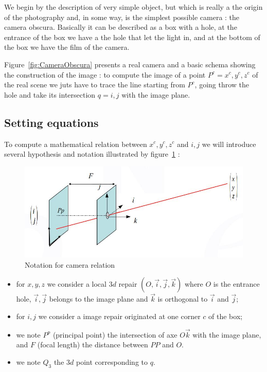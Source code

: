 We begin by the description of very simple object, but which is really a the origin of
the photography and, in some way, is the simplest possible camera  :  the camera obscura.
Basically it can be described as a box with a hole, at the entrance of the box we have
a the hole that let the light in, and at the bottom of the box we have the film of
the camera. 

Figure~\ref{fig:CameraObscura} presents a real camera and a basic schema showing
the construction of the image :  to compute the image of a point $P^c=x^c,y^c,z^c$ of the real scene
we juts have to trace the line starting from $P^c$, going throw the hole and take its intersection $q=i,j$
with the image plane.


\subsection{Setting equations}

To compute a mathematical relation between $x^c,y^c,z^c$ and $i,j$ we will introduce several hypothesis 
and notation illustrated by figure~\ref{fig:Camera3DNote} :

\begin{figure}
\centering
\includegraphics[width=12cm]{Methods/Images/Camera3D.jpg}\caption{Notation for camera relation}
	\label{fig:Camera3DNote}
\end{figure}

\begin{itemize}
	\item for $x,y,z$ we consider a local $3d$ repair $(O,\vec{i},\vec{j},\vec{k})$  where $O$ is the entrance hole,
              $\vec{i},\vec{j}$ belongs to the image plane and $\vec{k}$ is orthogonal to  $\vec{i}$ and $\vec{j}$;

	\item for $i,j$ we consider a image repair originated at one corner $c$ of the box;

	\item we note $P^p$ (principal point)  the intersection of axe $O\vec{k}$  with the image plane,
	      and $F$ (focal length) the distance between $PP$ and $O$.

        \item we note $Q_3$  the $3d$ point corresponding to $q$.

\end{itemize}

